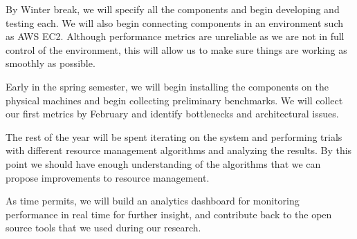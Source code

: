 \documentclass{sig-alternate}
\begin{document}
By Winter break, we will specify all the components and begin developing and testing each. We will also begin connecting components in an environment such as AWS EC2. Although performance metrics are unreliable as we are not in full control of the environment, this will allow us to make sure things are working as smoothly as possible.

Early in the spring semester, we will begin installing the components on the physical machines and begin collecting preliminary benchmarks. We will collect our first metrics by February and identify bottlenecks and architectural issues.

The rest of the year will be spent iterating on the system and performing trials with different resource management algorithms and analyzing the results. By this point we should have enough understanding of the algorithms that we can propose improvements to resource management.

As time permits, we will build an analytics dashboard for monitoring performance in real time for further insight, and contribute back to the open source tools that we used during our research.





\end{document}
